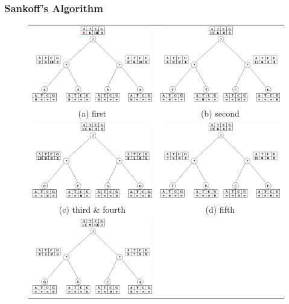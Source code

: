\documentclass[]{article}
\theoremstyle{definition}
\begin{document}
\subsubsection{Sankoff's Algorithm}
\begin{figure}[h!]
	\begin{tabular}{cc}
			\includegraphics*[width = 65mm]{image/tree_1.png} &   \includegraphics*[width = 65mm]{image/tree_2.png} \\
		(a) first & (b) second \\[6pt]
		\includegraphics*[width = 65mm]{image/tree_3-4.png} &   \includegraphics*[width = 65mm]{image/tree_5.png} \\
		(c) third \& fourth & (d) fifth \\[6pt]
		\includegraphics*[width = 65mm]{image/tree_6.png}&

\end{tabular}
\end{figure}
\end{document}
